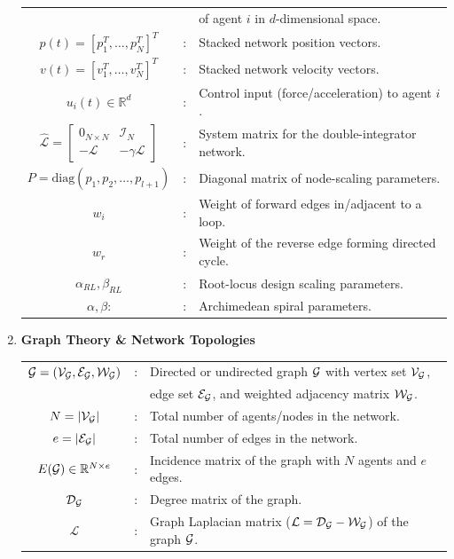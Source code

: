 \begin{enumerate}
\begin{tabular}{cll}
            & & of agent $i$ in $d$-dimensional space.\\
            $p(t) = [p_1^T, \dots, p_N^T]^T$ &:& Stacked network position vectors.\\
            $v(t) = [v_1^T, \dots, v_N^T]^T$ &:& Stacked network velocity vectors.\\
            $u_i(t) \in \mathbb{R}^d$ &:& Control input (force/acceleration) to agent $i$. \\
            $\hat{\mathcal{L}} = \begin{bmatrix} 0_{N \times N} & \mathcal{I}_N \\ -\mathcal{L} & -\gamma \mathcal{L} \end{bmatrix}$ &:& System matrix for the double-integrator network. \\
            $P = \text{diag}(p_1, p_2, \dots, p_{l+1})$ &:& Diagonal matrix of node-scaling parameters. \\
            $w_i$ &:& Weight of forward edges in/adjacent to a loop.\\
            $w_r$ &:& Weight of the reverse edge forming directed cycle. \\
            $\alpha_{RL}, \beta_{RL}$ &:& Root-locus design scaling parameters. \\
            $\alpha, \beta$: &:& Archimedean spiral parameters.\\
    \end{tabular}
    \newpage
    \item {\bf Graph Theory \& Network Topologies} \\
        \begin{tabular}{cll}
        	$\mathcal{G} = ({\mathcal{V}}_{\mathcal{G}},{\mathcal{E}}_{\mathcal{G}},{\mathcal{W}}_{\mathcal{G}})$    &:& Directed or undirected graph $\mathcal{G}$ with vertex set ${\mathcal{V}}_{\mathcal{G}}$, \\
                                    & & edge set ${\mathcal{E}}_{\mathcal{G}}$, and weighted adjacency matrix ${\mathcal{W}}_{\mathcal{G}}$.\\
            $N = |{\mathcal{V}}_{\mathcal{G}}|$             &:& Total number of agents/nodes in the network. \\
            $e = |{\mathcal{E}}_{\mathcal{G}}|$             &:& Total number of edges in the network. \\
            $E(\mathcal{G}) \in \mathbb{R}^{N \times e}$ &:& Incidence matrix of the graph with $N$ agents and $e$ edges. \\
            ${\mathcal{D}}_{\mathcal{G}}$                   &:& Degree matrix of the graph. \\
            $\mathcal{L}$ &:& Graph Laplacian matrix ($\mathcal{L} = {\mathcal{D}}_{\mathcal{G}} - {\mathcal{W}}_{\mathcal{G}}$) of the graph $\mathcal{G}$.\\

\end{tabular}
\end{enumerate}
